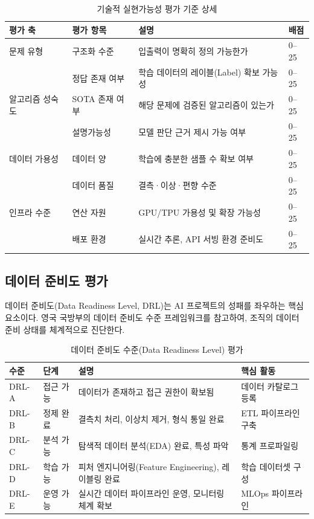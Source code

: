 \begin{table}[htbp]
\centering
\caption{기술적 실현가능성 평가 기준 상세}
\label{tab:tech_feasibility}
\begin{tabularx}{\textwidth}{p{2.2cm}p{3cm}Xp{2cm}}
\toprule
\textbf{평가 축} & \textbf{평가 항목} & \textbf{설명} & \textbf{배점} \\
\midrule
문제 유형 & 구조화 수준 & 입출력이 명확히 정의 가능한가 & 0--25 \\
& 정답 존재 여부 & 학습 데이터의 레이블(Label) 확보 가능성 & 0--25 \\
\midrule
알고리즘 성숙도 & SOTA 존재 여부 & 해당 문제에 검증된 알고리즘이 있는가 & 0--25 \\
& 설명가능성 & 모델 판단 근거 제시 가능 여부 & 0--25 \\
\midrule
데이터 가용성 & 데이터 양 & 학습에 충분한 샘플 수 확보 여부 & 0--25 \\
& 데이터 품질 & 결측·이상·편향 수준 & 0--25 \\
\midrule
인프라 수준 & 연산 자원 & GPU/TPU 가용성 및 확장 가능성 & 0--25 \\
& 배포 환경 & 실시간 추론, API 서빙 환경 준비도 & 0--25 \\
\bottomrule
\end{tabularx}
\end{table}

\subsection{데이터 준비도 평가}
\label{sec:8.1.3}

데이터 준비도(Data Readiness Level, DRL)는 AI 프로젝트의 성패를 좌우하는 핵심 요소이다. 영국 국방부의 데이터 준비도 수준 프레임워크를 참고하여, 조직의 데이터 준비 상태를 체계적으로 진단한다.

\begin{table}[htbp]
\centering
\caption{데이터 준비도 수준(Data Readiness Level) 평가}
\label{tab:data_readiness}
\begin{tabularx}{\textwidth}{p{1.5cm}p{2.5cm}Xp{2.5cm}}
\toprule
\textbf{수준} & \textbf{단계} & \textbf{설명} & \textbf{핵심 활동} \\
\midrule
DRL-A & 접근 가능 & 데이터가 존재하고 접근 권한이 확보됨 & 데이터 카탈로그 등록 \\
DRL-B & 정제 완료 & 결측치 처리, 이상치 제거, 형식 통일 완료 & ETL 파이프라인 구축 \\
DRL-C & 분석 가능 & 탐색적 데이터 분석(EDA) 완료, 특성 파악 & 통계 프로파일링 \\
DRL-D & 학습 가능 & 피처 엔지니어링(Feature Engineering), 레이블링 완료 & 학습 데이터셋 구성 \\
DRL-E & 운영 가능 & 실시간 데이터 파이프라인 운영, 모니터링 체계 확보 & MLOps 파이프라인 \\
\bottomrule
\end{tabularx}
\end{table}

